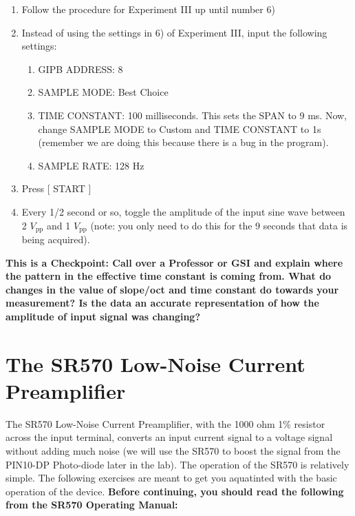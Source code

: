 \documentclass{../lab}
\begin{document}
\begin{enumerate}
    \item Follow the procedure for Experiment III up until number 6)

    \item Instead of using the settings in 6) of Experiment III, input the following settings:
    \begin{enumerate}
        \item GIPB ADDRESS: 8

        \item SAMPLE MODE: Best Choice

        \item TIME CONSTANT: 100 milliseconds. This sets the SPAN to 9 ms. Now, change SAMPLE MODE to Custom and TIME CONSTANT to 1s (remember we are doing this because there is a bug in the program).

        \item SAMPLE RATE: 128 Hz

    \end{enumerate}

    \item Press [ START ]

    \item Every 1/2 second or so, toggle the amplitude of the input sine wave between 2 $V_\text{pp}$ and 1 $V_\text{pp}$ (note: you only need to do this for the 9 seconds that data is being acquired).

\end{enumerate}

\textbf{This is a Checkpoint: Call over a Professor or GSI and explain where the pattern in the effective time constant is coming from. What do changes in the value of slope/oct and time constant do towards your measurement? Is the data an accurate representation of how the amplitude of input signal was changing?}

\section{The SR570 Low-Noise Current Preamplifier}

The SR570 Low-Noise Current Preamplifier, with the 1000 ohm 1\% resistor across the input terminal, converts an input current signal to a voltage signal without adding much noise (we will use the SR570 to boost the signal from the PIN10-DP Photo-diode later in the lab). The operation of the SR570 is relatively simple. The following exercises are meant to get you aquatinted with the basic operation of the device. \textbf{Before continuing, you should read the following from the SR570 Operating Manual:}
\end{document}

